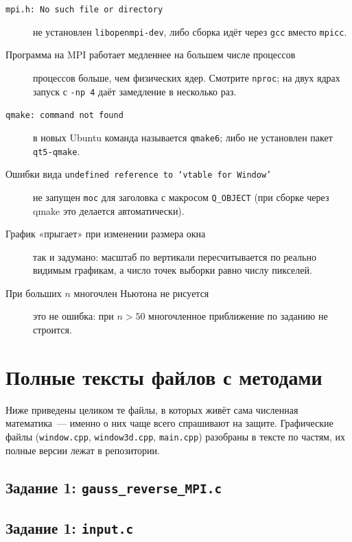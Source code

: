 \documentclass[11pt,a4paper]{report}
\begin{document}
\begin{description}
\item[\texttt{mpi.h: No such file or directory}] не установлен
\texttt{libopenmpi-dev}, либо сборка идёт через \texttt{gcc} вместо
\texttt{mpicc}.

\item[Программа на MPI работает медленнее на большем числе процессов]
процессов больше, чем физических ядер. Смотрите \texttt{nproc}; на двух ядрах
запуск с \texttt{-np 4} даёт замедление в несколько раз.

\item[\texttt{qmake: command not found}] в новых Ubuntu команда называется
\texttt{qmake6}; либо не установлен пакет \texttt{qt5-qmake}.

\item[Ошибки вида \texttt{undefined reference to `vtable for Window'}]
не запущен \texttt{moc} для заголовка с макросом \texttt{Q\_OBJECT}
(при сборке через qmake это делается автоматически).

\item[График «прыгает» при изменении размера окна] так и задумано: масштаб
по вертикали пересчитывается по реально видимым графикам, а число точек
выборки равно числу пикселей.

\item[При больших $n$ многочлен Ньютона не рисуется] это не ошибка:
при $n>50$ многочленное приближение по заданию не строится.
\end{description}

\chapter{Полные тексты файлов с методами}

Ниже приведены целиком те файлы, в которых живёт сама численная математика~---
именно о них чаще всего спрашивают на защите. Графические файлы
(\texttt{window.cpp}, \texttt{window3d.cpp}, \texttt{main.cpp}) разобраны в
тексте по частям, их полные версии лежат в репозитории.

\section{Задание 1: \texttt{gauss\_reverse\_MPI.c}}


\section{Задание 1: \texttt{input.c}}

\end{document}
